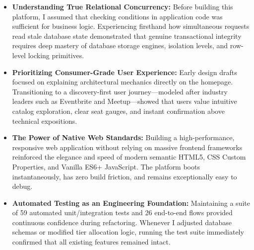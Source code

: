 \documentclass[11pt,a4paper]{report}
\begin{document}
\begin{itemize}[leftmargin=1.5em, itemsep=0.6em]
    \item \textbf{Understanding True Relational Concurrency:} Before building this platform, I assumed that checking conditions in application code was sufficient for business logic. Experiencing firsthand how simultaneous requests read stale database state demonstrated that genuine transactional integrity requires deep mastery of database storage engines, isolation levels, and row-level locking primitives.
    \item \textbf{Prioritizing Consumer-Grade User Experience:} Early design drafts focused on explaining architectural mechanics directly on the homepage. Transitioning to a discovery-first user journey---modeled after industry leaders such as Eventbrite and Meetup---showed that users value intuitive catalog exploration, clear seat gauges, and instant confirmation above technical expositions.
    \item \textbf{The Power of Native Web Standards:} Building a high-performance, responsive web application without relying on massive frontend frameworks reinforced the elegance and speed of modern semantic HTML5, CSS Custom Properties, and Vanilla ES6+ JavaScript. The platform boots instantaneously, has zero build friction, and remains exceptionally easy to debug.
    \item \textbf{Automated Testing as an Engineering Foundation:} Maintaining a suite of 59 automated unit/integration tests and 26 end-to-end flows provided continuous confidence during refactoring. Whenever I adjusted database schemas or modified tier allocation logic, running the test suite immediately confirmed that all existing features remained intact.
\end{itemize}
\end{document}
